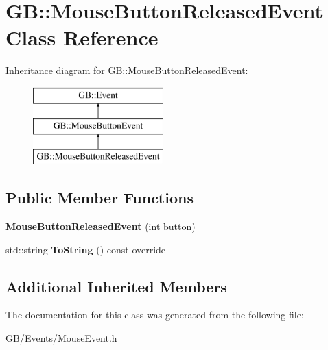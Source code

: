 \hypertarget{class_g_b_1_1_mouse_button_released_event}{}\section{GB\+::Mouse\+Button\+Released\+Event Class Reference}
\label{class_g_b_1_1_mouse_button_released_event}
Inheritance diagram for GB\+::Mouse\+Button\+Released\+Event\+:\begin{figure}[H]
\begin{center}
\leavevmode
\includegraphics[height=3.000000cm]{class_g_b_1_1_mouse_button_released_event}
\end{center}
\end{figure}
\subsection*{Public Member Functions}
\begin{DoxyCompactItemize}
\item 
\mbox{\label{class_g_b_1_1_mouse_button_released_event_a412b6752e447813b2d6ea6d046db86a6}} 
{\bfseries Mouse\+Button\+Released\+Event} (int button)
\item 
\mbox{\label{class_g_b_1_1_mouse_button_released_event_a7dd0f6c88021c715321803da6982a63f}} 
std\+::string {\bfseries To\+String} () const override
\end{DoxyCompactItemize}
\subsection*{Additional Inherited Members}


The documentation for this class was generated from the following file\+:\begin{DoxyCompactItemize}
\item 
G\+B/\+Events/Mouse\+Event.\+h\end{DoxyCompactItemize}
